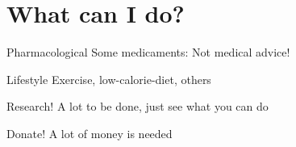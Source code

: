 \section{What can I do?}



\begin{frame}[c]{Pharmacological}
    Some medicaments: Not medical advice!
\end{frame}


\begin{frame}[c]{Lifestyle}
    Exercise, low-calorie-diet, others
\end{frame}


\begin{frame}[c]{Research!}
    A lot to be done, just see what you can do
\end{frame}


\begin{frame}[c]{Donate!}
    A lot of money is needed
\end{frame}
